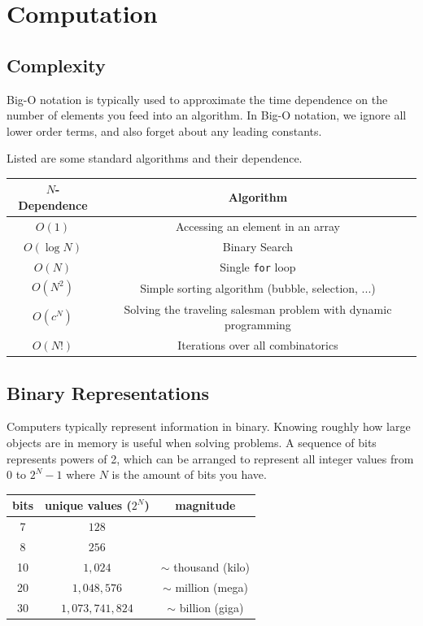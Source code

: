 \chapter{Computation}

\section{Complexity}

Big-O notation is typically used to approximate the time dependence on the number of elements you feed into an algorithm. In Big-O notation, we ignore all lower order terms, and also forget about any leading constants.

Listed are some standard algorithms and their dependence.

\begin{center}
\begin{tabular}{ | c | c|} 
\hline
 $N$-Dependence & Algorithm\\ \hline
$O(1)$ & Accessing an element in an array  \\ 
$O(\log N)$ & Binary Search  \\
$O(N)$ & Single \texttt{for} loop \\ 
$O(N^2)$ & Simple sorting algorithm (bubble, selection, ...)\\
$O(c^N)$ & Solving the traveling salesman problem with dynamic programming \\
$O(N!)$ & Iterations over all combinatorics \\
\hline
\end{tabular}
\end{center}

\section{Binary Representations}

Computers typically represent information in binary. Knowing roughly how large objects are in memory is useful when solving problems. A sequence of bits represents powers of 2, which can be arranged to represent all integer values from 0 to $2^N-1$ where $N$ is the amount of bits you have. 
\begin{center}
\begin{tabular}{ | c | c| c|} 
\hline
 bits & unique values ($2^N$) & magnitude \\ \hline
7 & $128$ &  \\ 
8 & $256$ &  \\ 
10 & $1,024$ & $\sim$ thousand (kilo) \\ 
20 & $1,048,576$ & $\sim$ million (mega) \\ 
30 & $1,073,741,824$ & $\sim$ billion (giga) \\ 
\hline
\end{tabular}
\end{center}

